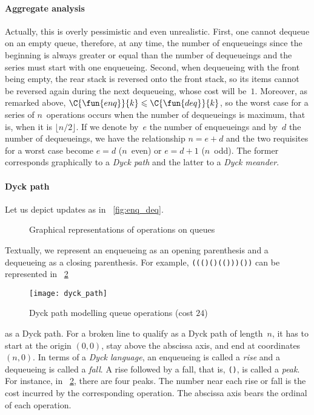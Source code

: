 \paragraph{Aggregate analysis}

Actually, this is overly pessimistic and even unrealistic. First, one
cannot dequeue on an empty queue, therefore, at any time, the number
of enqueueings since the beginning is always greater or equal than the
number of dequeueings and the series must start with one
enqueueing. Second, when dequeueing with the front being empty, the
rear stack is reversed onto the front stack, so its items cannot be
reversed again during the next dequeueing, whose cost will
be~\(1\). Moreover, as remarked above, \(\C{\fun{enq}}{k} \leqslant
\C{\fun{deq}}{k}\), so the worst case for a series of
\(n\)~operations occurs when the number of dequeueings is maximum,
that is, when it is \(\lfloor{n/2}\rfloor\). If we denote by~\(e\) the
number of enqueueings and by~\(d\) the number of dequeueings, we have
the relationship \(n = e + d\) and the two requisites for a worst case
become \(e=d\) (\(n\)~even) or \(e=d+1\) (\(n\)~odd). The former
corresponds graphically to a \emph{Dyck path} and the
latter to a \emph{Dyck meander}.

\paragraph{Dyck path}

Let us depict updates as in \fig~\vref{fig:enq_deq}.
\begin{figure}
\centering
{}
\qquad
{}
\caption{Graphical representations of operations on queues}
\label{fig:enq_deq}
\end{figure}
Textually, we represent an enqueueing as an opening parenthesis and a
dequeueing as a closing parenthesis. For example,
\texttt{((()()(()))())} can be represented in \fig~\ref{fig:dyck_path}
\begin{figure}
\centering
\texttt{[image: dyck\_path]}
\caption{Dyck path modelling queue operations (cost \(24\))}
\label{fig:dyck_path}
\end{figure}
as a Dyck path. For a broken line to qualify as a
Dyck path of length~\(n\), it has to start at the origin \((0,0)\),
stay above the abscissa axis, and end at coordinates \((n,0)\). In
terms of a \emph{Dyck language}, an enqueueing is called a
\emph{rise} and a dequeueing is called a
\emph{fall}. A rise followed by a fall, that is,
\texttt{()}, is called a \emph{peak}. For
instance, in \fig~\ref{fig:dyck_path}, there are four peaks. The
number near each rise or fall is the cost incurred by the
corresponding operation. The abscissa axis bears the ordinal of each
operation.

